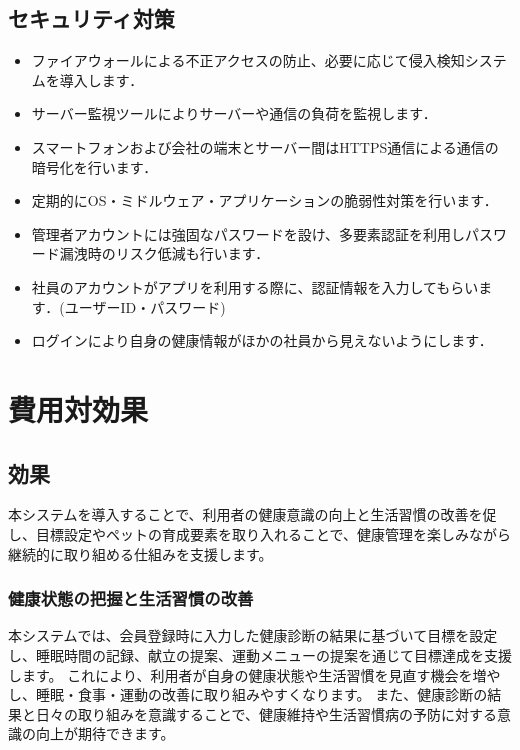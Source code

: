 \documentclass[uplatex,dvipdfmx]{jlreq}
\begin{document}
\subsection{セキュリティ対策}

\begin{itemize}

  \item ファイアウォールによる不正アクセスの防止、必要に応じて侵入検知システムを導入します．

  \item サーバー監視ツールによりサーバーや通信の負荷を監視します．

  \item スマートフォンおよび会社の端末とサーバー間はHTTPS通信による通信の暗号化を行います．

  \item 定期的にOS・ミドルウェア・アプリケーションの脆弱性対策を行います．

  \item 管理者アカウントには強固なパスワードを設け、多要素認証を利用しパスワード漏洩時のリスク低減も行います．

  \item 社員のアカウントがアプリを利用する際に、認証情報を入力してもらいます．(ユーザーID・パスワード)

  \item ログインにより自身の健康情報がほかの社員から見えないようにします．

\end{itemize}


\section{費用対効果}
\subsection{効果}
本システムを導入することで、利用者の健康意識の向上と生活習慣の改善を促し、目標設定やペットの育成要素を取り入れることで、健康管理を楽しみながら継続的に取り組める仕組みを支援します。

\subsubsection{健康状態の把握と生活習慣の改善 }
本システムでは、会員登録時に入力した健康診断の結果に基づいて目標を設定し、睡眠時間の記録、献立の提案、運動メニューの提案を通じて目標達成を支援します。
これにより、利用者が自身の健康状態や生活習慣を見直す機会を増やし、睡眠・食事・運動の改善に取り組みやすくなります。
また、健康診断の結果と日々の取り組みを意識することで、健康維持や生活習慣病の予防に対する意識の向上が期待できます。 
\end{document}

